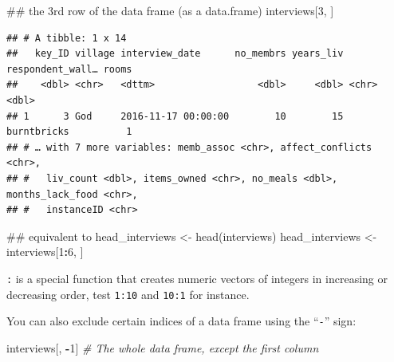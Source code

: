 \documentclass[]{book}
\newenvironment{Shaded}{\begin{snugshade}}{\end{snugshade}}
\newcommand{\DecValTok}[1]{\textcolor[rgb]{0.00,0.00,0.81}{#1}}
\newcommand{\StringTok}[1]{\textcolor[rgb]{0.31,0.60,0.02}{#1}}
\newcommand{\CommentTok}[1]{\textcolor[rgb]{0.56,0.35,0.01}{\textit{#1}}}
\newcommand{\OperatorTok}[1]{\textcolor[rgb]{0.81,0.36,0.00}{\textbf{#1}}}
\newcommand{\NormalTok}[1]{#1}
\begin{document}
\begin{Shaded}
\begin{Highlighting}[]
\NormalTok{## the 3rd row of the data frame (as a data.frame)}
\NormalTok{interviews[}\DecValTok{3}\NormalTok{, ]}
\end{Highlighting}
\end{Shaded}

\begin{verbatim}
## # A tibble: 1 x 14
##   key_ID village interview_date      no_membrs years_liv respondent_wall… rooms
##    <dbl> <chr>   <dttm>                  <dbl>     <dbl> <chr>            <dbl>
## 1      3 God     2016-11-17 00:00:00        10        15 burntbricks          1
## # … with 7 more variables: memb_assoc <chr>, affect_conflicts <chr>,
## #   liv_count <dbl>, items_owned <chr>, no_meals <dbl>, months_lack_food <chr>,
## #   instanceID <chr>
\end{verbatim}

\begin{Shaded}
\begin{Highlighting}[]
\NormalTok{## equivalent to head_interviews <- head(interviews)}
\NormalTok{head_interviews <-}\StringTok{ }\NormalTok{interviews[}\DecValTok{1}\OperatorTok{:}\DecValTok{6}\NormalTok{, ]}
\end{Highlighting}
\end{Shaded}

\texttt{:} is a special function that creates numeric vectors of
integers in increasing or decreasing order, test \texttt{1:10} and
\texttt{10:1} for instance.

You can also exclude certain indices of a data frame using the
``\texttt{-}'' sign:

\begin{Shaded}
\begin{Highlighting}[]
\NormalTok{interviews[, }\OperatorTok{-}\DecValTok{1}\NormalTok{]          }\CommentTok{# The whole data frame, except the first column}
\end{Highlighting}
\end{Shaded}
\end{document}
